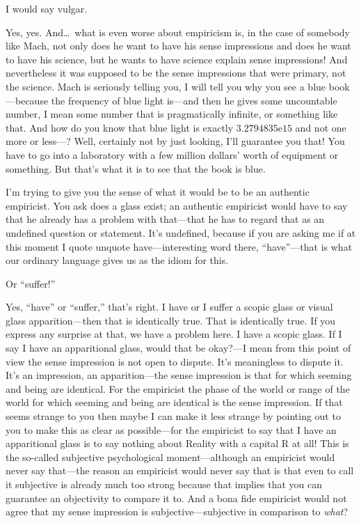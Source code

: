  I would say vulgar. 

 Yes, yes. And\ldots\ what is even worse about empiricism is, in the 
case of somebody like Mach, not only does he want to have his sense 
impressions and does he want to have his science, but he wants to have 
science explain sense impressions! And nevertheless it was supposed to 
be the sense impressions that were primary, not the science. Mach is 
seriously telling you, I will tell you why you see a blue book---because 
the frequency of blue light is---and then he gives some uncountable 
number, I mean some number that is pragmatically infinite, or something 
like that. And how do you know that blue light is exactly 
$3.2794835\mathrm{e}{15}$ and not one more or less---? Well, 
certainly not by just looking, I'll guarantee you that! You have to go 
into a laboratory with a few million dollars' worth of equipment or 
something. But that's what it is to see that the book is blue. 

I'm trying to give you the sense of what it would be to be an 
authentic empiricist. You ask does a glass exist; an authentic empiricist 
would have to say that he already has a problem with that---that he has 
to regard that as an undefined question or statement. It's undefined, 
because if you are asking me if at this moment I quote unquote 
have---interesting word there, \enquote{have}---that is what our ordinary 
language gives us as the idiom for this. 

 Or \enquote{suffer!} 

 Yes, \enquote{have} or \enquote{suffer,} that's right. I have or I suffer a scopic 
glass or visual glass apparition---then that is identically true. That is 
identically true. If you express any surprise at that, we have a problem 
here. I have a scopic glass. If I say I have an apparitional glass, would 
that be okay?---I mean from this point of view the sense impression is 
not open to dispute. It's meaningless to dispute it. It's an impression, an 
apparition---the sense impression is that for which seeming and being 
are identical. For the empiricist the phase of the world or range of the 
world for which seeming and being are identical is the sense impression. 
If that seems strange to you then maybe I can make it less strange by 
pointing out to you to make this as clear as possible---for the empiricist 
to say that I have an apparitional glass is to say nothing about Reality 
with a capital R at all! This is the so-called subjective psychological 
moment---although an empiricist would never say that---the reason an 
empiricist would never say that is that even to call it subjective is 
already much too strong because that implies that you can guarantee 
an objectivity to compare it to. And a bona fide empiricist would not 
agree that my sense impression is subjective---subjective in comparison 
to \emph{what}? 

